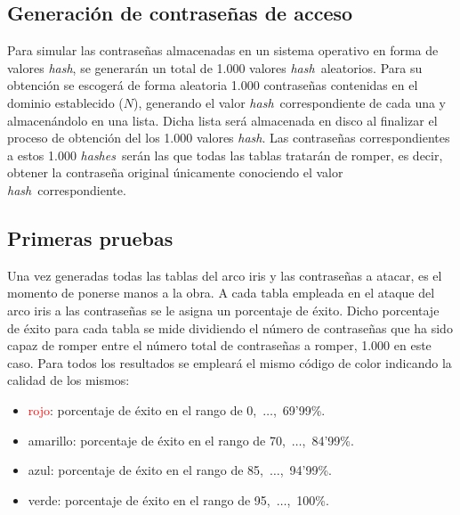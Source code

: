 \documentclass[12pt,spanish,listoffigures,listoftables,listofalgorithms]{tfgetsinf}
\newcommand{\hash}{\textit{hash}}
\newcommand{\hashes}{\textit{hashes}}
\begin{document}
\subsection{Generación de contraseñas de acceso} \label{contraseñas}

Para simular las contraseñas almacenadas en un sistema operativo en forma de valores \hash, se generarán un total de 1.000 valores \hash~aleatorios. Para su obtención se escogerá de forma aleatoria 1.000 contraseñas contenidas en el dominio establecido ($N$), generando el valor \hash~correspondiente de cada una y almacenándolo en una lista. Dicha lista será almacenada en disco al finalizar el proceso de obtención del los 1.000 valores \hash. Las contraseñas correspondientes a estos 1.000 \hashes~serán las que todas las tablas tratarán de romper, es decir, obtener la contraseña original únicamente conociendo el valor \hash~correspondiente.

\subsection{Primeras pruebas}\label{primeras pruebas}

Una vez generadas todas las tablas del arco iris y las contraseñas a atacar, es el momento de ponerse manos a la obra. A cada tabla empleada en el ataque del arco iris a las contraseñas se le asigna un porcentaje de éxito. Dicho porcentaje de éxito para cada tabla se mide dividiendo el número de contraseñas que ha sido capaz de romper entre el número total de contraseñas a romper, 1.000 en este caso. Para todos los resultados se empleará el mismo código de color indicando la calidad de los mismos:

\begin{itemize}

    \item \textcolor{red}{rojo}: porcentaje de éxito en el rango de 0,~$\dots$,~69'99\%.
    
    \item \textcolor{y}{amarillo}: porcentaje de éxito en el rango de 70,~$\dots$,~84'99\%.
    
    \item \textcolor{b}{azul}: porcentaje de éxito en el rango de 85,~$\dots$,~94'99\%.
    
    \item \textcolor{g}{verde}: porcentaje de éxito en el rango de 95,~$\dots$,~100\%.
    
\end{itemize}
\end{document}

